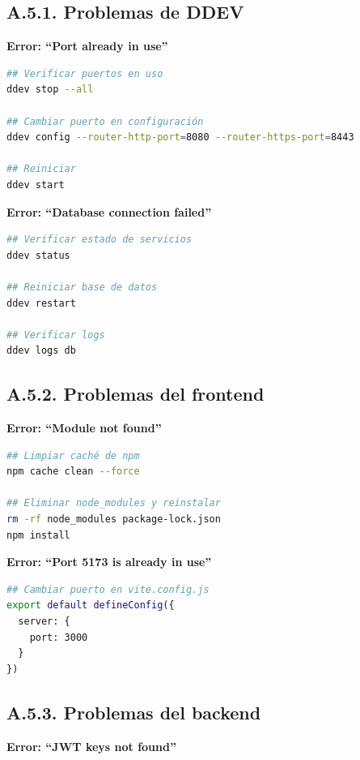 \documentclass[12pt,a4paper,oneside]{report}
\begin{document}
\subsection{A.5.1. Problemas de DDEV}\label{a.5.1.-problemas-de-ddev}

\textbf{Error: ``Port already in use''}

\begin{lstlisting}[language=bash]
## Verificar puertos en uso
ddev stop --all

## Cambiar puerto en configuración
ddev config --router-http-port=8080 --router-https-port=8443

## Reiniciar
ddev start
\end{lstlisting}

\textbf{Error: ``Database connection failed''}

\begin{lstlisting}[language=bash]
## Verificar estado de servicios
ddev status

## Reiniciar base de datos
ddev restart

## Verificar logs
ddev logs db
\end{lstlisting}

\subsection{A.5.2. Problemas del
frontend}\label{a.5.2.-problemas-del-frontend}

\textbf{Error: ``Module not found''}

\begin{lstlisting}[language=bash]
## Limpiar caché de npm
npm cache clean --force

## Eliminar node_modules y reinstalar
rm -rf node_modules package-lock.json
npm install
\end{lstlisting}

\textbf{Error: ``Port 5173 is already in use''}

\begin{lstlisting}[language=bash]
## Cambiar puerto en vite.config.js
export default defineConfig({
  server: {
    port: 3000
  }
})
\end{lstlisting}

\subsection{A.5.3. Problemas del
backend}\label{a.5.3.-problemas-del-backend}

\textbf{Error: ``JWT keys not found''}
\end{document}
